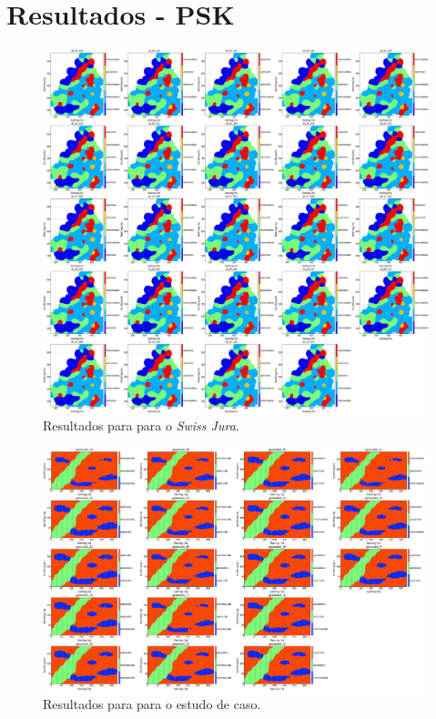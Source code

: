 \chapter{Resultados - PSK}\label{psk_res}

\begin{figure}[H]
	\caption{Resultados para para o \textit{Swiss Jura}.}
	\centering
		\includegraphics[width=1\textwidth]{apendice_b/kfp_jura.png}
\end{figure}

\begin{figure}[H]
	\caption{Resultados para para o estudo de caso.}
	\centering
		\includegraphics[width=1\textwidth]{apendice_b/kfp_study.png}
\end{figure}